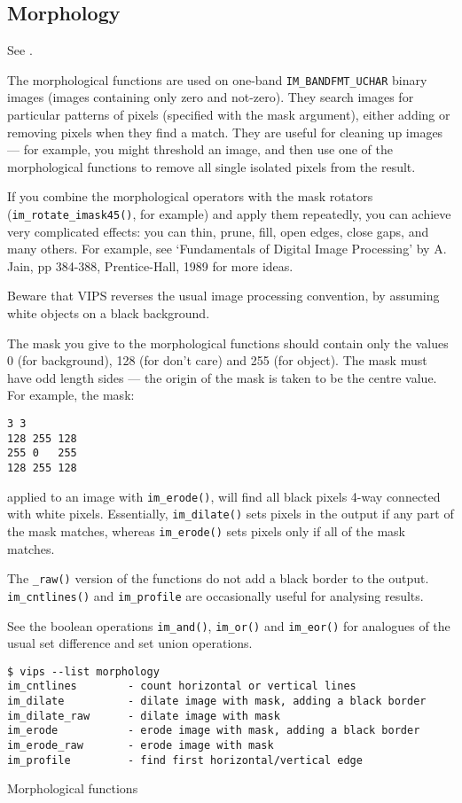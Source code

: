 \subsection{Morphology}

See .

The morphological functions are used on one-band \verb+IM_BANDFMT_UCHAR+ binary
images (images containing only zero and not-zero). They search images
for particular patterns of pixels (specified with the mask argument),
either adding or removing pixels when they find a match. They are useful
for cleaning up images --- for example, you might threshold an image, and
then use one of the morphological functions to remove all single isolated
pixels from the result.

If you combine the morphological operators with the mask rotators
(\verb+im_rotate_imask45()+, for example) and apply them repeatedly, you
can achieve very complicated effects: you can thin, prune, fill, open edges,
close gaps, and many others. For example, see `Fundamentals  of  Digital
Image Processing' by A.  Jain, pp 384-388, Prentice-Hall, 1989 for more ideas.

Beware that VIPS reverses the usual image processing convention, by assuming
white objects on a black background.

The mask you give to the morphological functions should contain only the
values 0 (for background), 128 (for don't care) and 255 (for object). The
mask must have odd length sides --- the origin of the mask is taken to be
the centre value. For example, the mask:

\begin{verbatim}
3 3 
128 255 128
255 0   255
128 255 128
\end{verbatim}
  
\noindent
applied to an image with \verb+im_erode()+, will find all black pixels
4-way connected with white pixels. Essentially, \verb+im_dilate()+
sets  pixels  in the output  if  any part of the mask matches, whereas
\verb+im_erode()+ sets pixels only if all of the mask matches.

The \verb+_raw()+ version of the functions do not add a black border to the
output. \verb+im_cntlines()+ and \verb+im_profile+ are occasionally useful for 
analysing results.

See the boolean operations \verb+im_and()+, \verb+im_or()+  and
\verb+im_eor()+ for  analogues of  the  usual  set difference and set
union operations.

\begin{fig2}
\begin{verbatim}
$ vips --list morphology
im_cntlines        - count horizontal or vertical lines
im_dilate          - dilate image with mask, adding a black border
im_dilate_raw      - dilate image with mask
im_erode           - erode image with mask, adding a black border
im_erode_raw       - erode image with mask
im_profile         - find first horizontal/vertical edge
\end{verbatim}
\caption{Morphological functions}
\label{fg:morph}
\end{fig2}

